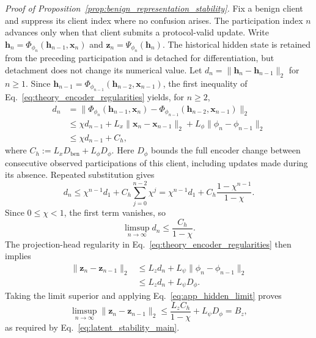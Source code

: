 \noindent\textit{Proof of Proposition~\ref{prop:benign_representation_stability}.} Fix a benign client and suppress its client index where no confusion arises. The participation index $n$ advances only when that client submits a protocol-valid update. Write $\mathbf{h}_n=\Phi_{\phi_n}(\mathbf{h}_{n-1},\mathbf{x}_n)$ and $\mathbf{z}_n=\Psi_{\phi_n}(\mathbf{h}_n)$. The historical hidden state is retained from the preceding participation and is detached for differentiation, but detachment does not change its numerical value. Let $d_n=\|\mathbf{h}_n-\mathbf{h}_{n-1}\|_2$ for $n\geq1$. Since $\mathbf{h}_{n-1}=\Phi_{\phi_{n-1}}(\mathbf{h}_{n-2},\mathbf{x}_{n-1})$, the first inequality of Eq.~\eqref{eq:theory_encoder_regularities} yields, for $n\geq2$,
\begin{align}
d_n&=\|\Phi_{\phi_n}(\mathbf{h}_{n-1},\mathbf{x}_n)-\Phi_{\phi_{n-1}}(\mathbf{h}_{n-2},\mathbf{x}_{n-1})\|_2\nonumber\\
&\leq\chi d_{n-1}+L_x\|\mathbf{x}_n-\mathbf{x}_{n-1}\|_2+L_\phi\|\phi_n-\phi_{n-1}\|_2\nonumber\\
&\leq\chi d_{n-1}+C_h,
\label{eq:app_hidden_recursion}
\end{align}
where $C_h:=L_xD_{\mathrm{ben}}+L_\phi D_\phi$. Here $D_\phi$ bounds the full encoder change between consecutive observed participations of this client, including updates made during its absence. Repeated substitution gives
\begin{equation}
d_n\leq\chi^{n-1}d_1+C_h\sum_{j=0}^{n-2}\chi^j=\chi^{n-1}d_1+C_h\frac{1-\chi^{n-1}}{1-\chi}.
\label{eq:app_hidden_finite_bound}
\end{equation}
Since $0\leq\chi<1$, the first term vanishes, so
\begin{equation}
\limsup_{n\to\infty}d_n\leq\frac{C_h}{1-\chi}.
\label{eq:app_hidden_limit}
\end{equation}
The projection-head regularity in Eq.~\eqref{eq:theory_encoder_regularities} then implies
\begin{equation}
\begin{aligned}
\|\mathbf{z}_n-\mathbf{z}_{n-1}\|_2&\leq L_zd_n+L_\psi\|\phi_n-\phi_{n-1}\|_2\\
&\leq L_zd_n+L_\psi D_\phi.
\end{aligned}
\label{eq:app_latent_difference}
\end{equation}
Taking the limit superior and applying Eq.~\eqref{eq:app_hidden_limit} proves
\begin{equation}
\limsup_{n\to\infty}\|\mathbf{z}_n-\mathbf{z}_{n-1}\|_2\leq\frac{L_zC_h}{1-\chi}+L_\psi D_\phi=B_z,
\end{equation}
as required by Eq.~\eqref{eq:latent_stability_main}.

